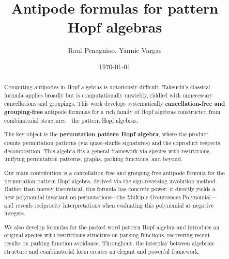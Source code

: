 \documentclass[12pt, reqno]{amsart}
\theoremstyle{definition}
\begin{document}
\title{Antipode formulas for pattern Hopf algebras} %



\author{Raul Penaguiao, Yannic Vargas}
\address{HAEUSLER AG}
\address{CUNEF University}
\date{\today} %

\begin{abstract}
Computing antipodes in Hopf algebras is notoriously difficult. Takeuchi's classical formula applies broadly but is computationally unwieldy, riddled with unnecessary cancellations and groupings. This work develops systematically \textbf{cancellation-free and grouping-free} antipode formulas for a rich family of Hopf algebras constructed from combinatorial structures---the pattern Hopf algebras.

The key object is the \textbf{permutation pattern Hopf algebra}, where the product counts permutation patterns (via quasi-shuffle signatures) and the coproduct respects decomposition. This algebra fits a general framework via species with restrictions, unifying permutation patterns, graphs, parking functions, and beyond.

Our main contribution is a cancellation-free and grouping-free antipode formula for the permutation pattern Hopf algebra, derived via the sign-reversing involution method. Rather than merely theoretical, this formula has concrete power: it directly yields a new polynomial invariant on permutations---the Multiple Occurrences Polynomial---and reveals reciprocity interpretations when evaluating this polynomial at negative integers.

We also develop formulas for the packed word pattern Hopf algebra and introduce an original species with restrictions structure on parking functions, recovering recent results on parking function avoidance. Throughout, the interplay between algebraic structure and combinatorial form creates an elegant and powerful framework.
\end{abstract}
\end{document}
